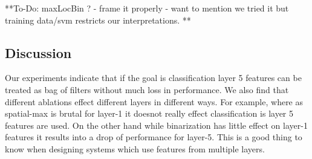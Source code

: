 \documentclass[runningheads]{llncs}
\begin{document}
\setlength{\tabcolsep}{1pt}
\begin{table}
\begin{center}
\caption{Effect of various feature ablations on object detection using R-CNN\cite{Rcnn}.}
\label{table:det-ablation}
\end{center}
\end{table}
\setlength{\tabcolsep}{1.4pt}

**To-Do: maxLocBin ? - frame it properly - want to mention we tried it but training data/svm restricts our interpretations. **

\subsection{Discussion}
Our experiments indicate that if the goal is classification layer 5 features can be treated as bag of filters without much loss in performance. We also find that different ablations effect different layers in different ways. For example, where as spatial-max is brutal for layer-1 it doesnot really effect classification is layer 5 features are used. On the other hand while binarization has little effect on layer-1 features it results into a drop of performance for layer-5. This is a good thing to know when designing systems which use features from multiple layers.
\end{document}
